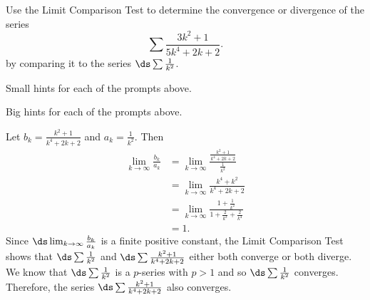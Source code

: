 \begin{activity} \label{8.3.Act7} Use the Limit Comparison Test to determine the convergence or divergence of the series
\[\sum \frac{3k^2+1}{5k^4+2k+2}.\]
by comparing it to the series $\ds \sum \frac{1}{k^2}$.

\end{activity}

\begin{smallhint}
\ba
	\item Small hints for each of the prompts above.
\ea
\end{smallhint}
\begin{bighint}
\ba
	\item Big hints for each of the prompts above.
\ea
\end{bighint}
\begin{activitySolution}
Let $b_k = \frac{k^2+1}{k^4+2k+2}$ and $a_k = \frac{1}{k^2}$. Then
\begin{align*}
\lim_{k \to \infty} \frac{b_k}{a_k} &= \lim_{k \to \infty} \frac{\frac{k^2+1}{k^4+2k+2}}{\frac{1}{k^2}} \\
    &= \lim_{k \to \infty} \frac{k^4+k^2}{k^4+2k+2} \\
    &= \lim_{k \to \infty} \frac{1+\frac{1}{k^2}}{1+\frac{2}{k^3}+\frac{2}{k^4}} \\
    &= 1.
\end{align*}
 Since $\ds \lim_{k \to \infty} \frac{b_k}{a_k}$ is a finite positive constant, the Limit Comparison Test shows that $\ds \sum \frac{1}{k^2}$ and $\ds \sum \frac{k^2+1}{k^4+2k+2}$ either both converge or both diverge. We know that $\ds \sum \frac{1}{k^2}$ is a $p$-series with $p > 1$ and so $\ds \sum \frac{1}{k^2}$  converges. Therefore, the series $\ds \sum \frac{k^2+1}{k^4+2k+2}$ also converges.
\end{activitySolution}
\aftera 